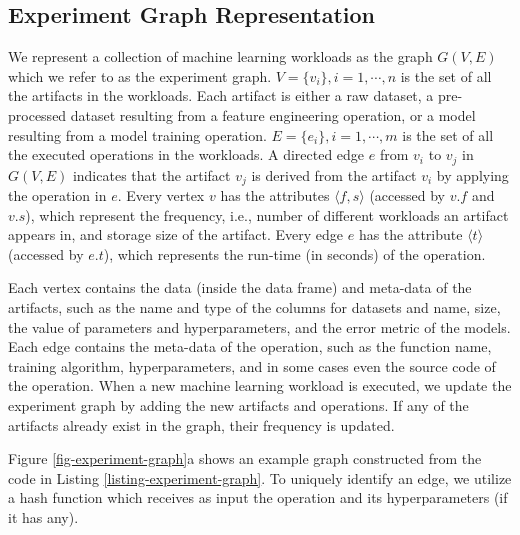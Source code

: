 \subsection{Experiment Graph Representation}\label{sub-graph-construction}
We represent a collection of machine learning workloads as the graph $G(V, E)$ which we refer to as the experiment graph.
$V=\{v_i\}, i = 1, \cdots, n$ is the set of all the artifacts in the workloads.
Each artifact is either a raw dataset, a pre-processed dataset resulting from a feature engineering operation, or a model resulting from a model training operation.
$E=\{e_i\}, i = 1, \cdots, m$ is the set of all the executed operations in the workloads.
A directed edge $e$ from $v_i$ to $v_j$ in $G(V, E)$ indicates that the artifact $v_j$ is derived from the artifact $v_i$ by applying the operation in $e$.
Every vertex $v$ has the attributes $\langle f, s \rangle$ (accessed by $v.f$ and $v.s$), which represent the  frequency, i.e., number of different workloads an artifact appears in, and storage size of the artifact.
Every edge $e$ has the attribute $\langle t \rangle$ (accessed by $e.t$), which represents the run-time (in seconds) of the operation.


Each vertex contains the data (inside the data frame) and meta-data of the artifacts, such as the name and type of the columns for datasets and name, size, the value of parameters and hyperparameters, and the error metric of the models.
Each edge contains the meta-data of the operation, such as the function name, training algorithm, hyperparameters, and in some cases even the source code of the operation.
When a new machine learning workload is executed, we update the experiment graph by adding the new artifacts and operations.
If any of the artifacts already exist in the graph, their frequency is updated.

Figure \ref{fig-experiment-graph}a shows an example graph constructed from the code in Listing \ref{listing-experiment-graph}.
To uniquely identify an edge, we utilize a hash function which receives as input the operation and its hyperparameters (if it has any).


